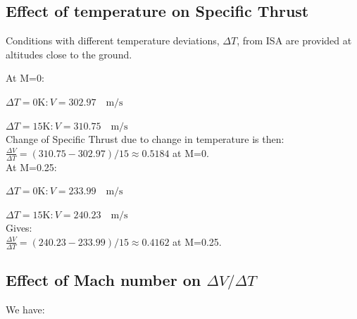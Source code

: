 \documentclass[english]{kththesis}
\begin{document}
\clearpage

\subsection{Effect of temperature on Specific Thrust}

Conditions with different temperature deviations, $\Delta T$, from ISA are provided at altitudes close to the ground.

At M=0:

$\Delta T=0 \mathrm{K}: V = 302.97 \quad\mathrm{m/s}$

$\Delta T=15 \mathrm{K}: V = 310.75 \quad\mathrm{m/s}$\\

Change of Specific Thrust due to change in temperature is then:\\

$\frac{\Delta V}{\Delta T} =  (310.75-302.97)/15 \approx 0.5184$ at   M=0.\\

At M=0.25:

$\Delta T=0 \mathrm{K}: V = 233.99 \quad\mathrm{m/s}$

$\Delta T=15 \mathrm{K}: V = 240.23 \quad\mathrm{m/s}$\\

Gives:\\

$\frac{\Delta V}{\Delta T}  =  (240.23-233.99)/15 \approx 0.4162 $ at M=0.25.\\




\subsection{Effect of Mach number on $\Delta V / \Delta T$}

We have:\\
\end{document}
